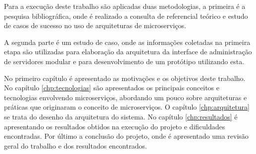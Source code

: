 Para a execução deste trabalho são aplicadas duas metodologias, a primeira
é a pesquisa bibliográfica, onde é realizado a consulta de referencial
teórico e estudo de casos de sucesso no uso de arquiteturas de microserviços.

A segunda parte é um estudo de caso, onde as informações coletadas
na primeira etapa são utilizadas para elaboração da arquitetura da interface
de administração de servidores modular e para desenvolvimento de um protótipo
utilizando esta.

No primeiro capítulo é apresentado as motivações e os objetivos deste trabalho.
No capítulo \ref{chp:tecnologias} são apresentados os principais conceitos
e tecnologias envolvendo microserviços, abordando um pouco sobre arquiteturas
e práticas que originaram o conceito de microserviços. O capítulo
\ref{chp:arquitetura} se trata do desenho da arquitetura do sistema. No
capítulo \ref{chp:resultados} é apresentando os resultados obtidos na execução
do projeto e dificuldades encontradas. Por último a conclusão do projeto,
onde é apresentado uma revisão geral do trabalho e dos resultados encontrados.
